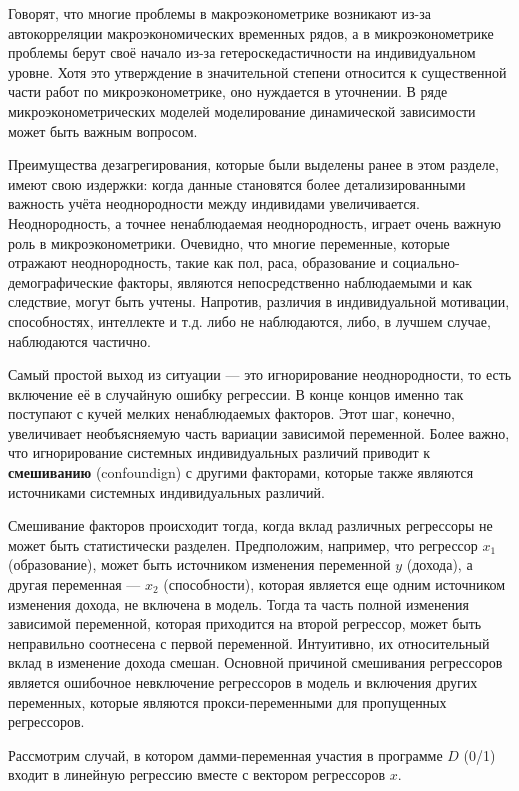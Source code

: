 Говорят, что многие проблемы в макроэконометрике возникают из-за автокорреляции макроэкономических временных рядов, а в микроэконометрике проблемы берут своё начало из-за гетероскедастичности на индивидуальном уровне. 
Хотя это утверждение в значительной степени относится к существенной части работ по микроэконометрике, оно нуждается в уточнении.
В ряде  микроэконометрических моделей моделирование динамической зависимости может быть важным вопросом.
	
	
Преимущества дезагрегирования, которые были выделены ранее в этом разделе, имеют свою издержки:  когда данные становятся более детализированными важность учёта неоднородности между индивидами увеличивается. Неоднородность, а точнее ненаблюдаемая неоднородность, играет очень важную роль в микроэконометрики. Очевидно, что многие переменные, которые отражают неоднородность, такие как пол, раса, образование и социально-демографические факторы, являются непосредственно наблюдаемыми и как следствие, могут быть учтены. Напротив, различия в индивидуальной мотивации, способностях, интеллекте и т.д. либо не наблюдаются, либо, в лучшем случае,  наблюдаются частично.
	
	
Самый простой выход из ситуации --- это игнорирование неоднородности, то есть включение её в случайную ошибку регрессии. В конце концов именно так поступают с кучей мелких ненаблюдаемых факторов. Этот шаг, конечно, увеличивает необъясняемую часть вариации зависимой переменной. Более важно, что игнорирование системных индивидуальных различий приводит к \textbf{смешиванию} (confoundign) с другими факторами, которые также являются источниками системных индивидуальных различий. 

Смешивание факторов происходит тогда, когда вклад различных регрессоры  не может быть статистически разделен. Предположим, например, что регрессор $x_{1}$ (образование), может быть источником изменения переменной $y$ (дохода), а другая переменная --- $x_{2}$ (способности), которая является еще одним источником изменения дохода, не включена в модель. Тогда та часть полной изменения зависимой переменной, которая приходится на второй регрессор, может быть неправильно соотнесена с первой переменной. Интуитивно, их относительный вклад в изменение дохода смешан. Основной причиной смешивания регрессоров является ошибочное невключение регрессоров в модель и включения других переменных, которые являются прокси-переменными для пропущенных регрессоров.
	

Рассмотрим случай, в котором дамми-переменная участия в программе $D$ (0/1) входит в линейную регрессию вместе с вектором регрессоров $x$.
	
